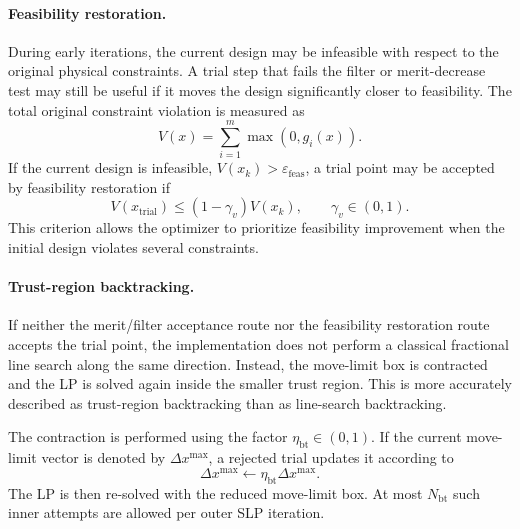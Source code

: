 \documentclass[11pt,a4paper]{article}
\begin{document}
\paragraph{Feasibility restoration.}

During early iterations, the current design may be infeasible with
respect to the original physical constraints. A trial step that fails
the filter or merit-decrease test may still be useful if it moves the
design significantly closer to feasibility. The total original
constraint violation is measured as
\begin{equation}
\label{eq:appA_total_violation}
    V(x)
    =
    \sum_{i=1}^{m}
    \max\left(0,g_i(x)\right).
\end{equation}
If the current design is infeasible,
$V(x_k)>\varepsilon_{\mathrm{feas}}$, a trial point may be accepted
by feasibility restoration if
\begin{equation}
\label{eq:appA_feas}
    V(x_{\mathrm{trial}})
    \leq
    (1-\gamma_v)V(x_k),
    \qquad
    \gamma_v\in(0,1).
\end{equation}
This criterion allows the optimizer to prioritize feasibility
improvement when the initial design violates several constraints.

\paragraph{Trust-region backtracking.}

If neither the merit/filter acceptance route nor the feasibility
restoration route accepts the trial point, the implementation does
not perform a classical fractional line search along the same
direction. Instead, the move-limit box is contracted and the LP is
solved again inside the smaller trust region. This is more accurately
described as trust-region backtracking than as line-search
backtracking.

The contraction is performed using the factor
$\eta_{\mathrm{bt}}\in(0,1)$. If the current move-limit vector is
denoted by $\Delta x^{\max}$, a rejected trial updates it according to
\begin{equation}
\label{eq:appA_bt_shrink}
    \Delta x^{\max}
    \leftarrow
    \eta_{\mathrm{bt}}\Delta x^{\max}.
\end{equation}
The LP is then re-solved with the reduced move-limit box. At most
$N_{\mathrm{bt}}$ such inner attempts are allowed per outer SLP
iteration.
\end{document}
